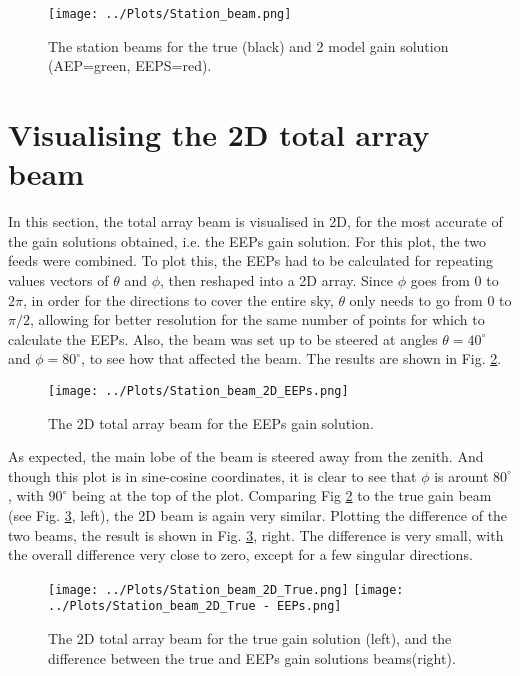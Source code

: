\documentclass[12pt]{report} %
\begin{document}
\begin{figure}[htbp]
  \centering
  \texttt{[image: ../Plots/Station\_beam.png]}
  \caption{The station beams for the true (black) and 2 model gain solution (AEP=green, EEPS=red). }
  \label{fig:station_beam_AEP}
\end{figure}



\section{Visualising the 2D total array beam}

In this section, the total array beam is visualised in 2D, for the most accurate of the gain solutions obtained, i.e. the EEPs gain solution. For this plot, the two feeds were combined. To plot this, the EEPs had to be calculated for repeating values vectors of $\theta$ and $\phi$, then reshaped into a 2D array. Since $\phi$ goes from $0$ to $2\pi$, in order for the directions to cover the entire sky, $\theta$ only needs to go from $0$ to $\pi/2$, allowing for better resolution for the same number of points for which to calculate the EEPs. Also, the beam was set up to be steered at angles $\theta = 40^{\circ}$ and $\phi = 80^{\circ}$, to see how that affected the beam. The results are shown in Fig. \ref{fig:2D_beam_EEP}.
\begin{figure}[h]
    \centering
    \texttt{[image: ../Plots/Station\_beam\_2D\_EEPs.png]}
    \caption{The 2D total array beam for the EEPs gain solution.}
    \label{fig:2D_beam_EEP}
\end{figure}

As expected, the main lobe of the beam is steered away from the zenith. And though this plot is in sine-cosine coordinates, it is clear to see that $\phi$ is arount $80^{\circ}$, with $90^{\circ}$ being at the top of the plot. Comparing Fig \ref{fig:2D_beam_EEP} to the true gain beam (see Fig. \ref{fig:2D_beam_true_diff}, left), the 2D beam is again very similar. Plotting the difference of the two beams, the result is shown in Fig. \ref{fig:2D_beam_true_diff}, right. The difference is very small, with the overall difference very close to zero, except for a few singular directions.

\begin{figure}[h]
    \centering
    \texttt{[image: ../Plots/Station\_beam\_2D\_True.png]}
    \texttt{[image: ../Plots/Station\_beam\_2D\_True - EEPs.png]}
    \caption{The 2D total array beam for the true gain solution (left), and the difference between the true and EEPs gain solutions beams(right).}
    \label{fig:2D_beam_true_diff}
\end{figure}
\end{document}
